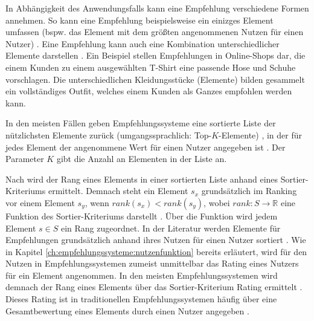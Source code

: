 In Abhängigkeit des Anwendungsfalls kann eine Empfehlung verschiedene Formen annehmen.
So kann eine Empfehlung beispielsweise ein einizges Element umfassen (bspw. das Element mit dem größten angenommenen Nutzen für einen Nutzer) \cite[S. 6]{ricci:inbook}.
Eine Empfehlung kann auch eine Kombination unterschiedlicher Elemente darstellen \cite[S. 7]{ricci:inbook}.
Ein Beispiel stellen Empfehlungen in Online-Shops dar, die einem Kunden zu einem ausgewählten T-Shirt eine passende Hose und Schuhe vorschlagen.
Die unterschiedlichen Kleidungsstücke (Elemente) bilden gesammelt ein vollständiges Outfit, welches einem Kunden als Ganzes empfohlen werden kann.

In den meisten Fällen geben Empfehlungssysteme eine sortierte Liste der nützlichsten Elemente zurück (umgangssprachlich: Top-$K$-Elemente) \cite[S. 3]{recommenderSystems:2016}\cite[S. 141]{ekstrand:article}, in der für jedes Element der angenommene Wert für einen Nutzer angegeben ist \cite[S. 6]{ricci:inbook}.
Der Parameter $K$ gibt die Anzahl an Elementen in der Liste an.

Nach \textcite[S. 900]{adomavicius:article} wird der Rang eines Elements in einer sortierten Liste anhand eines Sortier-Kriteriums ermittelt.
Demnach steht ein Element $s_{x}$ grundsätzlich im Ranking vor einem Element $s_{y}$, wenn $rank(s_{x})<rank(s_{y})$, wobei $rank: S \rightarrow \mathbb{R}$ eine Funktion des Sortier-Kriteri\-ums darstellt \cite[S. 900]{adomavicius:article}.
Über die Funktion wird jedem Element $s \in S$ ein Rang zugeordnet.
In der Literatur werden Elemente für Empfehlungen grundsätzlich anhand ihres Nutzen für einen Nutzer sortiert \cite[S. 735]{adomavicius:inproceedings}\cite[S. 10f.]{ricci:inbook}.
Wie in Kapitel \ref{ch:empfehlungssysteme:nutzenfunktion} bereits erläutert, wird für den Nutzen in Empfehlungssystemen zumeist unmittelbar das Rating eines Nutzers für ein Element angenommen.
In den meisten Empfehlungssystemen wird demnach der Rang eines Elements über das Sortier-Kriterium Rating ermittelt \cite[S. 900]{adomavicius:article}.
Dieses Rating ist in traditionellen Empfehlungssystemen häufig über eine Gesamtbewertung eines Elements durch einen Nutzer angegeben \cite[S. 219]{lakiotaki:inproceedings}.

